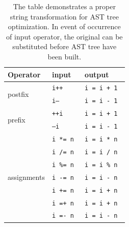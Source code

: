 \documentclass{report}
\begin{document}
\begin{table}[h]
\centering 
\begin{tabular}{|l|l|l|}
\hline
     Operator                        & input   & output     \\ \hline
\multirow{2}{*}{postfix}     & \texttt{i++}     & \texttt{i = i + 1  }  \\ \cline{2-3} 
                             & \texttt{i--}     & \texttt{i = i - 1  }  \\ \hline
\multirow{2}{*}{prefix}      & \texttt{++i}     & \texttt{i = i + 1 }   \\ \cline{2-3} 
                             & \texttt{--i }    & \texttt{i = i - 1}    \\ \hline
\multirow{7}{*}{assignments} & \texttt{i *= n } & \texttt{i = i * n } \\ \cline{2-3} 
                             & \texttt{i /= n  }& \texttt{i = i / n } \\ \cline{2-3} 
                             & \texttt{i \%= n }& \texttt{i = i \% n }\\ \cline{2-3} 
                             & \texttt{i -= n } & \texttt{i = i - n } \\ \cline{2-3} 
                             & \texttt{i += n  }& \texttt{i = i + n } \\ \cline{2-3} 
                             & \texttt{i =+ n } & \texttt{i = i + n}  \\ \cline{2-3} 
                             & \texttt{i =- n } & \texttt{i = i - n } \\ \hline
\end{tabular}
\caption[Combinations of statement substitutions to create more similar trees]{The table demonstrates a proper string transformation for AST tree optimization. In event of occurrence  of input operator, the original can be substituted before AST tree have been built.}
\label{table:operators}
\end{table}
\end{document}
